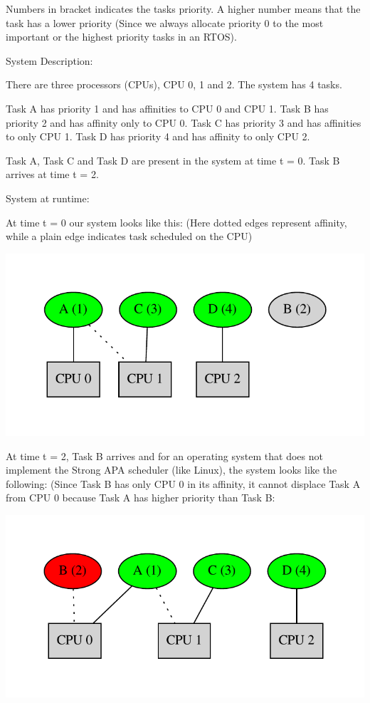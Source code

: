 Numbers in bracket indicate\textquotesingle{}s the task\textquotesingle{}s priority. A higher number means that the task has a lower priority (Since we always allocate priority 0 to the most important or the highest priority tasks in an R\+T\+OS).

System Description\+:

There are three processors (C\+P\+Us), C\+PU 0, 1 and 2. The system has 4 tasks.

Task A has priority 1 and has affinities to C\+PU 0 and C\+PU 1. Task B has priority 2 and has affinity only to C\+PU 0. Task C has priority 3 and has affinities to only C\+PU 1. Task D has priority 4 and has affinity to only C\+PU 2.

Task A, Task C and Task D are present in the system at time t = 0. Task B arrives at time t = 2.

System at runtime\+:

At time t = 0 our system looks like this\+: (Here dotted edges represent affinity, while a plain edge indicates task scheduled on the C\+PU)


\begin{DoxyImageNoCaption}
  \mbox{\includegraphics[width=\textwidth,height=\textheight/2,keepaspectratio=true]{dot_inline_dotgraph_2}}
\end{DoxyImageNoCaption}


At time t = 2, Task B arrives and for an operating system that does not implement the Strong A\+PA scheduler (like Linux), the system looks like the following\+: (Since Task B has only C\+PU 0 in its affinity, it cannot displace Task A from C\+PU 0 because Task A has higher priority than Task B\+:


\begin{DoxyImageNoCaption}
  \mbox{\includegraphics[width=\textwidth,height=\textheight/2,keepaspectratio=true]{dot_inline_dotgraph_3}}
\end{DoxyImageNoCaption}


